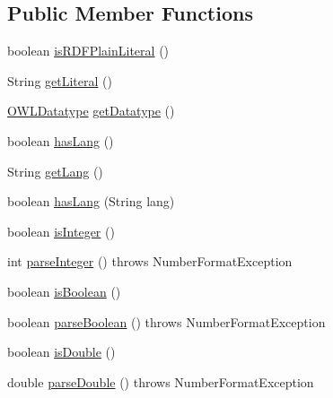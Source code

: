 \subsection*{Public Member Functions}
\begin{DoxyCompactItemize}
\item 
boolean \hyperlink{interfaceorg_1_1semanticweb_1_1owlapi_1_1model_1_1_o_w_l_literal_ab091e1489434c5b1cfbf571d8f86cc16}{is\-R\-D\-F\-Plain\-Literal} ()
\item 
String \hyperlink{interfaceorg_1_1semanticweb_1_1owlapi_1_1model_1_1_o_w_l_literal_aacb0fb488e81615e81b7ea08eed49e6e}{get\-Literal} ()
\item 
\hyperlink{interfaceorg_1_1semanticweb_1_1owlapi_1_1model_1_1_o_w_l_datatype}{O\-W\-L\-Datatype} \hyperlink{interfaceorg_1_1semanticweb_1_1owlapi_1_1model_1_1_o_w_l_literal_a1c2034a75313be951747d163dd68ca34}{get\-Datatype} ()
\item 
boolean \hyperlink{interfaceorg_1_1semanticweb_1_1owlapi_1_1model_1_1_o_w_l_literal_a182e9cb2b7c3973b0a0dedb0fbf9a1fc}{has\-Lang} ()
\item 
String \hyperlink{interfaceorg_1_1semanticweb_1_1owlapi_1_1model_1_1_o_w_l_literal_aa2d490ab587f33a3df2cdd466a83aab4}{get\-Lang} ()
\item 
boolean \hyperlink{interfaceorg_1_1semanticweb_1_1owlapi_1_1model_1_1_o_w_l_literal_a01a34848d48b433d3a7853e571ee05cb}{has\-Lang} (String lang)
\item 
boolean \hyperlink{interfaceorg_1_1semanticweb_1_1owlapi_1_1model_1_1_o_w_l_literal_a971010dd0c2d068dc515368119db1f36}{is\-Integer} ()
\item 
int \hyperlink{interfaceorg_1_1semanticweb_1_1owlapi_1_1model_1_1_o_w_l_literal_aa9588514afb25a6a03d55da1bc08effe}{parse\-Integer} ()  throws Number\-Format\-Exception
\item 
boolean \hyperlink{interfaceorg_1_1semanticweb_1_1owlapi_1_1model_1_1_o_w_l_literal_a3d0e65e73ea57a08bd7a6b65c58e6309}{is\-Boolean} ()
\item 
boolean \hyperlink{interfaceorg_1_1semanticweb_1_1owlapi_1_1model_1_1_o_w_l_literal_a3b562c13096f8a7dbd1866ea29a9c028}{parse\-Boolean} ()  throws Number\-Format\-Exception
\item 
boolean \hyperlink{interfaceorg_1_1semanticweb_1_1owlapi_1_1model_1_1_o_w_l_literal_aa93d949188e001866b37a8b8b350b180}{is\-Double} ()
\item 
double \hyperlink{interfaceorg_1_1semanticweb_1_1owlapi_1_1model_1_1_o_w_l_literal_aa90b61be5c58737c91c49860a62d21fd}{parse\-Double} ()  throws Number\-Format\-Exception

\end{DoxyCompactItemize}
